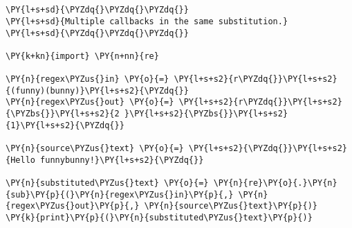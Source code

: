 

\section*{}

\begin{Verbatim}[commandchars=\\\{\}]
\PY{l+s+sd}{\PYZdq{}\PYZdq{}\PYZdq{}}
\PY{l+s+sd}{Multiple callbacks in the same substitution.}
\PY{l+s+sd}{\PYZdq{}\PYZdq{}\PYZdq{}}

\PY{k+kn}{import} \PY{n+nn}{re}

\PY{n}{regex\PYZus{}in} \PY{o}{=} \PY{l+s+s2}{r\PYZdq{}}\PY{l+s+s2}{(funny)(bunny)}\PY{l+s+s2}{\PYZdq{}}
\PY{n}{regex\PYZus{}out} \PY{o}{=} \PY{l+s+s2}{r\PYZdq{}}\PY{l+s+s2}{\PYZbs{}}\PY{l+s+s2}{2 }\PY{l+s+s2}{\PYZbs{}}\PY{l+s+s2}{1}\PY{l+s+s2}{\PYZdq{}}

\PY{n}{source\PYZus{}text} \PY{o}{=} \PY{l+s+s2}{\PYZdq{}}\PY{l+s+s2}{Hello funnybunny!}\PY{l+s+s2}{\PYZdq{}}

\PY{n}{substituted\PYZus{}text} \PY{o}{=} \PY{n}{re}\PY{o}{.}\PY{n}{sub}\PY{p}{(}\PY{n}{regex\PYZus{}in}\PY{p}{,} \PY{n}{regex\PYZus{}out}\PY{p}{,} \PY{n}{source\PYZus{}text}\PY{p}{)}
\PY{k}{print}\PY{p}{(}\PY{n}{substituted\PYZus{}text}\PY{p}{)}
\end{Verbatim}

